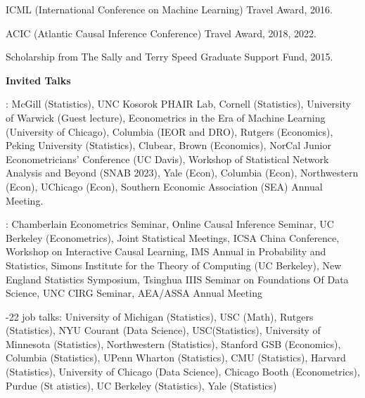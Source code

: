 \documentclass{article}
\begin{document}
\vspace{2mm}
ICML (International Conference on Machine Learning) Travel Award, 2016.

\vspace{2mm}
ACIC (Atlantic Causal Inference Conference) Travel Award, 2018, 2022.

\vspace{2mm}
Scholarship from The Sally and Terry Speed Graduate Support Fund, 2015.

\vspace{5mm}

\begin{large}
\noindent \textbf{Invited Talks}
\end{large}

\vspace{4mm}
: McGill (Statistics), UNC Kosorok PHAIR Lab, Cornell (Statistics), University of Warwick (Guest lecture), Econometrics in the Era of Machine Learning (University of Chicago), Columbia (IEOR and DRO), Rutgers (Economics), Peking University (Statistics), Clubear, Brown (Economics), NorCal Junior Econometricians' Conference (UC Davis), Workshop of Statistical Network Analysis and Beyond (SNAB 2023), Yale (Econ), Columbia (Econ), Northwestern (Econ), UChicago (Econ), Southern Economic Association (SEA) Annual Meeting.

\vspace{4mm}
: Chamberlain Econometrics Seminar, Online Causal Inference Seminar, UC Berkeley (Econometrics), Joint Statistical Meetings, ICSA China Conference, Workshop on Interactive Causal Learning, IMS Annual in Probability and Statistics, Simons Institute for the Theory of Computing (UC Berkeley), New England Statistics Symposium, Tsinghua IIIS Seminar on Foundations Of Data Science, UNC CIRG Seminar, AEA/ASSA Annual Meeting

\vspace{4mm}
-22 job talks: University of Michigan (Statistics), USC (Math), Rutgers (Statistics), NYU Courant (Data Science), USC(Statistics), University of Minnesota (Statistics), Northwestern (Statistics), Stanford GSB (Economics), Columbia (Statistics), UPenn Wharton (Statistics), CMU (Statistics), Harvard (Statistics), University of Chicago (Data Science), Chicago Booth (Econometrics), Purdue (St
atistics), UC Berkeley (Statistics), Yale (Statistics)
\end{document}
